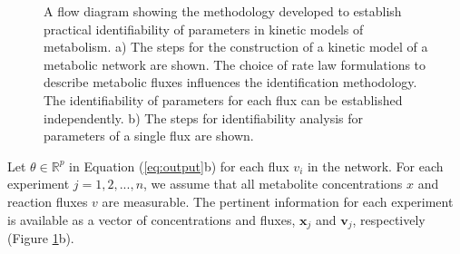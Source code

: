 \documentclass[10pt]{article}
\begin{document}
\begin{figure}[!tbhp]
	\caption{A flow diagram showing the methodology developed to establish practical identifiability of parameters in kinetic models of metabolism. a) The steps for the construction of a kinetic model of a metabolic network are shown. The choice of rate law formulations to describe metabolic fluxes influences the identification methodology. The identifiability of parameters for each flux can be established independently. b) The steps for identifiability analysis for parameters of a single flux are shown.}\label{fig:ident-flowchart}
\end{figure}	

Let $\theta \in \mathbb{R}^p$ in Equation (\ref{eq:output}b) for each flux $v_i$ in the network. For each experiment $j = {1, 2, ..., n}$, we assume that all metabolite concentrations $x$ and reaction fluxes $v$ are measurable. The pertinent information for each experiment is available as a vector of concentrations and fluxes, $\mathbf{x}_j$ and $\mathbf{v}_j$, respectively (Figure \ref{fig:ident-flowchart}b). 
\end{document}
